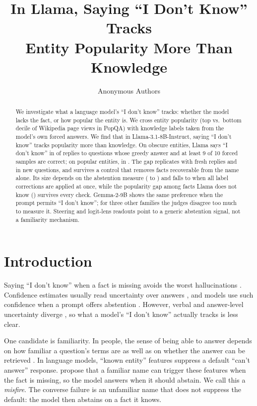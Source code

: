 \documentclass{article}
\title{In Llama, Saying ``I Don't Know'' Tracks\\Entity Popularity More Than Knowledge}
\author{Anonymous Authors}
\newcommand{\idk}{``I don't know''}
\begin{document}
\maketitle

\begin{abstract}
We investigate what a language model's \idk{} tracks: whether the model lacks the fact, or how popular the entity is. We cross entity popularity (top vs.\ bottom decile of Wikipedia page views in PopQA) with knowledge labels taken from the model's own forced answers. We find that in Llama-3.1-8B-Instruct, saying \idk{} tracks popularity more than knowledge. On obscure entities, Llama says \idk{} in \tcObsKnownAbsPct{} of replies to questions whose greedy answer and at least 9 of 10 forced samples are correct; on popular entities, in \tcPopKnownAbsPct. The gap replicates with fresh replies and in new questions, and survives a control that removes facts recoverable from the name alone. Its size depends on the abstention measure (\hjLlamaDiff{} to \faLlamaRegexDiff) and falls to \rcJoint{} \rcJointCI{} when all label corrections are applied at once, while the popularity gap among facts Llama does not know (\rcUnk) survives every check. Gemma-2-9B shows the same preference when the prompt permits \idk; for three other families the judges disagree too much to measure it. Steering and logit-lens readouts point to a generic abstention signal, not a familiarity mechanism.
\end{abstract}

\section{Introduction}

Saying \idk{} when a fact is missing avoids the worst hallucinations \citep{kalai2025hallucinate}. Confidence estimates usually read uncertainty over answers \citep{kadavath2022know,kuhn2023semantic,stolfo2024confidence}, and models use such confidence when a prompt offers abstention \citep{kumaran2026confidence}. However, verbal and answer-level uncertainty diverge \citep{ji2025hedging}, so what a model's \idk{} actually tracks is less clear.

One candidate is familiarity. In people, the sense of being able to answer depends on how familiar a question's terms are as well as on whether the answer can be retrieved \citep{reder1992,schwartz1992,koriat2001cascade}. In language models, ``known entity'' features suppress a default ``can't answer'' response. \citet{lindsey2025biology} propose that a familiar name can trigger these features when the fact is missing, so the model answers when it should abstain. We call this a \emph{misfire}. The converse failure is an unfamiliar name that does not suppress the default: the model then abstains on a fact it knows.
\end{document}
